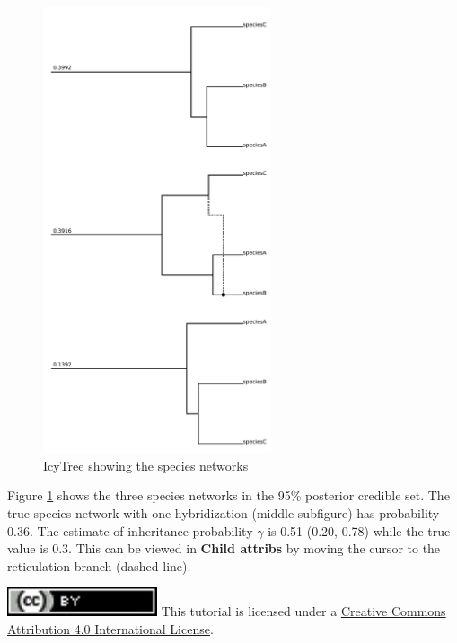 \documentclass[11pt]{article}
\begin{document}
\begin{figure}[h]
\center
\includegraphics[width=0.6\textwidth]{figs/icytree.pdf}
\caption{IcyTree showing the species networks}
\label{fig_networks}
\end{figure}

Figure \ref{fig_networks} shows the three species networks in the 95\% posterior credible set. The true species network with one hybridization (middle subfigure) has probability 0.36. The estimate of inheritance probability $\gamma$ is 0.51 (0.20, 0.78) while the true value is 0.3. This can be viewed in \textbf{Child attribs} by moving the cursor to the reticulation branch (dashed line).

\clearpage
\noindent \href{http://creativecommons.org/licenses/by/4.0/}{\includegraphics[scale=0.7]{figs/fig_ccby.pdf}} This tutorial is licensed under a \href{http://creativecommons.org/licenses/by/4.0/}{Creative Commons Attribution 4.0 International License}. 



\end{document}

